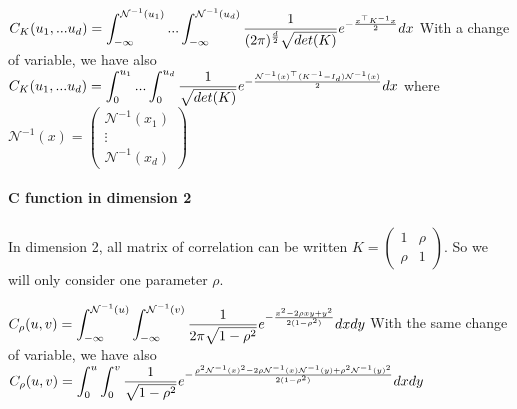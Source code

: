 \documentclass{article}
\begin{document}
	
	\begin{math}
	 C_{K}(u_{1},...u_{d})= \mathlarger{ \int_{-\infty}^{\mathcal{N}^{-1}(u_{1})}...\int_{-\infty}^{\mathcal{N}^{-1}(u_{d})} \frac{1}{(2\pi)^{\frac{d}{2}}\sqrt{det(K)}}e^{-\frac{x^\top K^{-1} x}{2}}dx}
	\end{math}
	\newline
	\newline
	With a change of variable, we have also \newline
	\newline
	\begin{math}
	C_{K}(u_{1},...u_{d})=  \mathlarger{ \int_{0}^{u_{1}}...\int_{0}^{u_{d}} \frac{1}{\sqrt{det(K)}}e^{-\frac{\mathcal{N}^{-1}(x)^\top (K^{-1}-I_{d}) \mathcal{N}^{-1}(x)}{2}}dx}
	\end{math}
	\newline
	\newline
	\newline
	where \begin{math} \mathcal{N}^{-1}(x) =  \begin{pmatrix}
   \mathcal{N}^{-1}(x_{1}) \\
  \vdots   \\
   \mathcal{N}^{-1}(x_{d})  
 \end{pmatrix}\end{math}
 
\paragraph{C function in dimension 2} 
 	
 	In dimension 2, all matrix of correlation can be written \begin{math} K = 
 \begin{pmatrix}
  1 & \rho \\
  \rho & 1
 \end{pmatrix}
\end{math}. So we will only consider one parameter \begin{math} \rho \end{math}.\newline
\newline

\begin{math}
	C_{\rho} (u,v) = \mathlarger{\int_{-\infty}^{\mathcal{N}^{-1}(u)}\int_{-\infty}^{\mathcal{N}^{-1}(v)} \frac{1}{2\pi\sqrt{1-\rho^{2}}}e^{-\frac{x^2-2\rho x y +y^{2}}{2(1-\rho^{2})} }dx dy} 
\end{math}
\newline
\newline
With the same change of variable, we have also
\newline
\begin{math}
	C_{\rho} (u,v) = \mathlarger{\int_{0}^{u}\int_{0}^{v} \frac{1}{\sqrt{1-\rho^{2}}}e^{-\frac{\rho^{2}\mathcal{N}^{-1}(x)^2-2\rho\mathcal{N}^{-1}(x)\mathcal{N}^{-1}(y) + \rho^{2} \mathcal{N}^{-1}(y)^{2}}{2(1-\rho^{2})} }dx dy} 
\end{math} 
 
\end{document}
